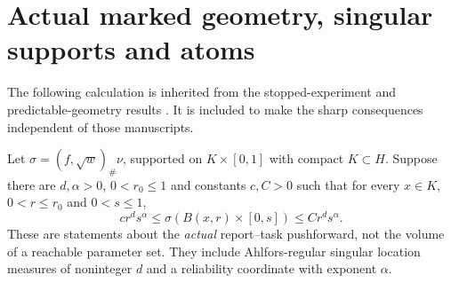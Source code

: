 \section{Actual marked geometry, singular supports and atoms}
The following calculation is inherited from the stopped-experiment and predictable-geometry results \cite{GTF52,GTF54}. It is included to make the sharp consequences independent of those manuscripts.

Let $\sigma=(f,\sqrt w)_\#\nu$, supported on $K\times[0,1]$ with compact $K\subset H$. Suppose there are $d,\alpha>0$, $0<r_0\le1$ and constants $c,C>0$ such that for every $x\in K$, $0<r\le r_0$ and $0<s\le1$,
\begin{equation}\label{eq:rectangle}
 c r^d s^\alpha\le\sigma(B(x,r)\times[0,s])\le C r^d s^\alpha.
\end{equation}
These are statements about the \emph{actual} report--task pushforward, not the volume of a reachable parameter set. They include Ahlfors-regular singular location measures of noninteger $d$ and a reliability coordinate with exponent $\alpha$.

